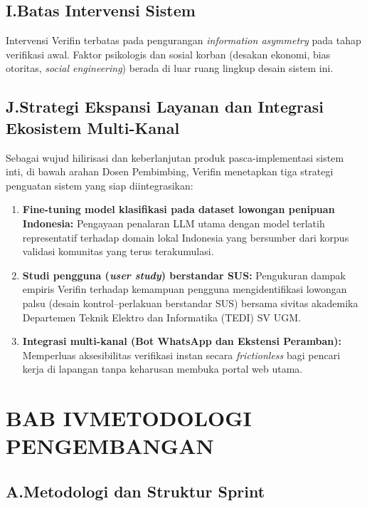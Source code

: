 \documentclass[12pt,a4paper]{article}
\begin{document}
\subsection*{I.\quad Batas Intervensi Sistem}
Intervensi Verifin terbatas pada pengurangan \textit{information asymmetry} pada tahap
verifikasi awal. Faktor psikologis dan sosial korban (desakan ekonomi, bias otoritas,
\textit{social engineering}) berada di luar ruang lingkup desain sistem ini.

\subsection*{J.\quad Strategi Ekspansi Layanan dan Integrasi Ekosistem Multi-Kanal}
Sebagai wujud hilirisasi dan keberlanjutan produk pasca-implementasi sistem inti, di bawah arahan Dosen Pembimbing, Verifin menetapkan tiga strategi penguatan sistem yang siap diintegrasikan:
\begin{enumerate}[label=\textbf{\arabic*.}]
\item \textbf{Fine-tuning model klasifikasi pada dataset lowongan penipuan Indonesia:} Pengayaan penalaran LLM utama dengan model terlatih representatif terhadap domain lokal Indonesia yang bersumber dari korpus validasi komunitas yang terus terakumulasi.
\item \textbf{Studi pengguna (\textit{user study}) berstandar SUS:} Pengukuran dampak empiris Verifin terhadap kemampuan pengguna mengidentifikasi lowongan palsu (desain kontrol--perlakuan berstandar SUS) bersama sivitas akademika Departemen Teknik Elektro dan Informatika (TEDI) SV UGM.
\item \textbf{Integrasi multi-kanal (Bot WhatsApp dan Ekstensi Peramban):} Memperluas aksesibilitas verifikasi instan secara \textit{frictionless} bagi pencari kerja di lapangan tanpa keharusan membuka portal web utama.
\end{enumerate}


\section*{BAB IV\quad METODOLOGI PENGEMBANGAN}

\subsection*{A.\quad Metodologi dan Struktur Sprint}
\end{document}
